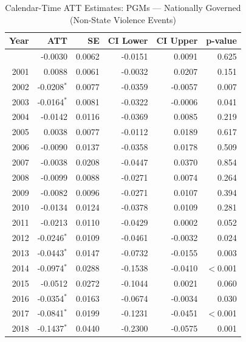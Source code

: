 \begin{longtable}{rrrrrr}
\caption{Calendar-Time ATT Estimates: PGMs --- Nationally Governed (Non-State Violence Events)} \label{tab:cal_pgms} \\
\toprule
\textbf{Year} & \textbf{ATT} & \textbf{SE} & \textbf{CI Lower} & \textbf{CI Upper} & \textbf{p-value} \\
\midrule
\endfirsthead
\bottomrule
\endlastfoot
2000 & -0.0030 & 0.0062 & -0.0151 & 0.0091 & 0.625 \\
2001 & 0.0088 & 0.0061 & -0.0032 & 0.0207 & 0.151 \\
2002 & -0.0208$^{*}$ & 0.0077 & -0.0359 & -0.0057 & 0.007 \\
2003 & -0.0164$^{*}$ & 0.0081 & -0.0322 & -0.0006 & 0.041 \\
2004 & -0.0142 & 0.0116 & -0.0369 & 0.0085 & 0.219 \\
2005 & 0.0038 & 0.0077 & -0.0112 & 0.0189 & 0.617 \\
2006 & -0.0090 & 0.0137 & -0.0358 & 0.0178 & 0.509 \\
2007 & -0.0038 & 0.0208 & -0.0447 & 0.0370 & 0.854 \\
2008 & -0.0099 & 0.0088 & -0.0271 & 0.0074 & 0.264 \\
2009 & -0.0082 & 0.0096 & -0.0271 & 0.0107 & 0.394 \\
2010 & -0.0134 & 0.0124 & -0.0378 & 0.0109 & 0.281 \\
2011 & -0.0213 & 0.0110 & -0.0429 & 0.0002 & 0.052 \\
2012 & -0.0246$^{*}$ & 0.0109 & -0.0461 & -0.0032 & 0.024 \\
2013 & -0.0443$^{*}$ & 0.0147 & -0.0732 & -0.0155 & 0.003 \\
2014 & -0.0974$^{*}$ & 0.0288 & -0.1538 & -0.0410 & $<$0.001 \\
2015 & -0.0512 & 0.0272 & -0.1044 & 0.0021 & 0.060 \\
2016 & -0.0354$^{*}$ & 0.0163 & -0.0674 & -0.0034 & 0.030 \\
2017 & -0.0841$^{*}$ & 0.0199 & -0.1231 & -0.0451 & $<$0.001 \\
2018 & -0.1437$^{*}$ & 0.0440 & -0.2300 & -0.0575 & 0.001 \\
\end{longtable}
